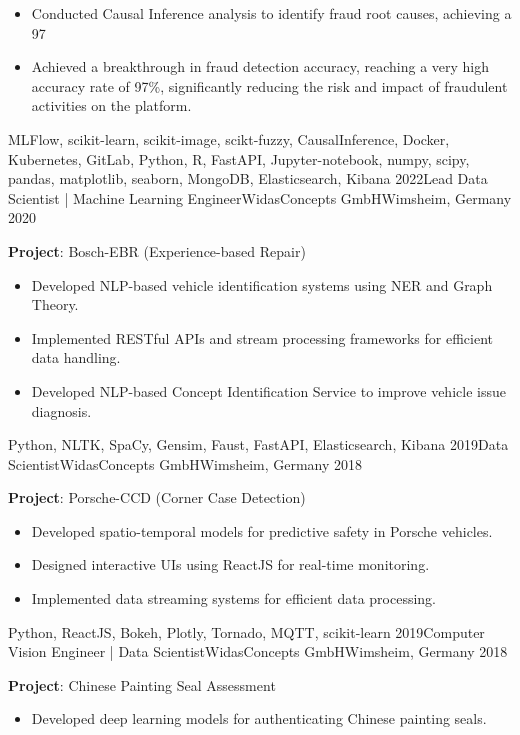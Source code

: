 \begin{experiences}
{\begin{itemize}
			\item Conducted Causal Inference analysis to identify fraud root causes, achieving a 97%
			\item Achieved a breakthrough in fraud detection accuracy, reaching a very high accuracy rate of 97\%, significantly reducing the risk and impact of fraudulent activities on the platform.
		\end{itemize}
	}
	{MLFlow, scikit-learn, scikit-image, scikt-fuzzy, CausalInference, Docker, Kubernetes, GitLab, Python, R,  FastAPI, Jupyter-notebook, numpy, scipy, pandas, matplotlib, seaborn, MongoDB, Elasticsearch, Kibana}
	\emptySeparator
	\experience
	{2022}{Lead Data Scientist | Machine Learning Engineer}{WidasConcepts GmbH}{Wimsheim, Germany}
	{2020} {
		\vspace{0.1cm}
		\textbf{Project}: Bosch-EBR (Experience-based Repair)
		\begin{itemize}
			\item Developed NLP-based vehicle identification systems using NER and Graph Theory.
			\item Implemented RESTful APIs and stream processing frameworks for efficient data handling.
			\item Developed NLP-based Concept Identification Service to improve vehicle issue diagnosis.	
		\end{itemize}
	}
	{Python, NLTK, SpaCy, Gensim, Faust, FastAPI, Elasticsearch, Kibana}
	\emptySeparator
	\experience
	{2019}{Data Scientist}{WidasConcepts GmbH}{Wimsheim, Germany}
	{2018} {
		\vspace{0.1cm}
		\textbf{Project}: Porsche-CCD (Corner Case Detection)
		\begin{itemize}
			\item Developed spatio-temporal models for predictive safety in Porsche vehicles.
			
			\item Designed interactive UIs using ReactJS for real-time monitoring.
			
			\item Implemented data streaming systems for efficient data processing.
			
		\end{itemize}
	}
	{Python, ReactJS, Bokeh, Plotly, Tornado, MQTT, scikit-learn}
	\emptySeparator
	\experience
	{2019}{Computer Vision Engineer | Data Scientist}{WidasConcepts GmbH}{Wimsheim, Germany}
	{2018} {
		\vspace{0.1cm}
		\textbf{Project}: Chinese Painting Seal Assessment
		\begin{itemize}
			\item Developed deep learning models for authenticating Chinese painting seals.
			

\end{itemize}}
\end{experiences}
